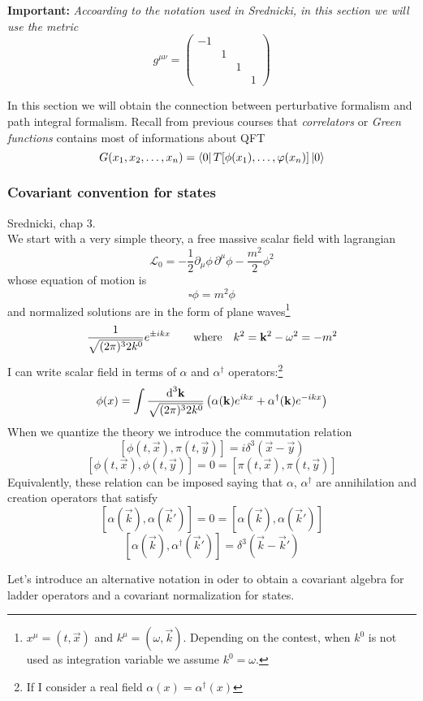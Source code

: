 \documentclass[../main/main.tex]{subfiles}
\begin{document}
\textbf{Important:} \textit{Accoarding to the notation used in Srednicki, in this section we will use the metric}
\[g^{\mu\nu}=\begin{pmatrix}-1&&&\\&1&&\\&&1&\\&&&1\end{pmatrix}\]

\skipline
In this section we will obtain the connection between perturbative formalism and path integral formalism.
Recall from previous courses that \emph{correlators} or \emph{Green functions} contains most of informations about QFT
\[G(x_1,x_2,\dots,x_n)=\bra0T[\phi(x_1),\dots,\varphi(x_n)]\ket0\]

\subsubsection{Covariant convention for states}
\textsf{Srednicki, chap 3}.\\

We start with a very simple theory, a free massive scalar field with lagrangian
\[\mathcal L_0=-\frac12\partial_\mu\phi\,\partial^\mu\phi-\frac{m^2}2\phi^2\]
whose  equation of motion is 
\[\square\phi=m^2\phi\]
and normalized solutions are in the form of plane waves\footnote{$x^\mu=(t,\vec x)$ and $k^\mu=(\omega,\vec k)$. Depending on the contest, when $k^0$ is not used as integration variable we assume $k^0=\omega$.}
\[ \frac1{\sqrt{(2\pi)^32k^0}}e^{\pm ik x}\qquad\textup{where}\quad k^2=\vec k^2-\omega^2=-m^2\]
I can write scalar field in terms of $\alpha$ and $\alpha^\dagger$ operators:\footnote{If I consider a real field $\alpha(x)=\alpha^\dagger(x)$}
\[\phi(x)=\int\frac{\de^3\vec k}{\sqrt{(2\pi)^32k^0}}\left(\alpha(\vec k)e^{ikx}+\alpha^\dagger(\vec k)e^{-ikx}\right)\]
When we quantize the theory we introduce the commutation relation
\[[\phi(t,\vec x),\pi(t,\vec y)]=i\delta^3(\vec x-\vec y)\]
\[[\phi(t,\vec x),\phi(t,\vec y)]=0=[\pi(t,\vec x),\pi(t,\vec y)]\]
Equivalently, these relation can be imposed saying that $\alpha$, $\alpha^\dagger$ are annihilation and creation operators that satisfy
\[[\alpha(\vec k),\alpha(\vec k')]=0=[\alpha(\vec k),\alpha(\vec k')]\]
\[[\alpha(\vec k), \alpha^\dagger(\vec k')]=\delta^3(\vec k-\vec k')\]

\skipline


Let's introduce an alternative notation in oder to obtain a covariant algebra for ladder operators and a covariant normalization for states.
\end{document}
